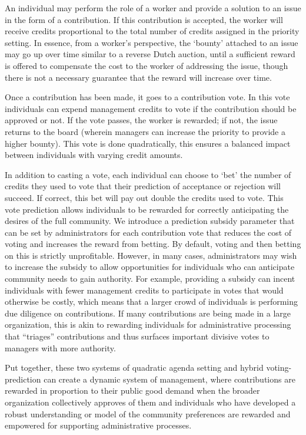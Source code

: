 \documentclass{article}
\begin{document}
An individual may perform the role of a worker and provide a solution to an issue in the form of a contribution. If this contribution is accepted, the worker will receive credits proportional to the total number of credits assigned in the priority setting. In essence, from a worker's perspective, the `bounty' attached to an issue may go up over time similar to a reverse Dutch auction, until a sufficient reward is offered to compensate the cost to the worker of addressing the issue, though there is not a necessary guarantee that the reward will increase over time.

Once a contribution has been made, it goes to a contribution vote. In this vote individuals can expend management credits to vote if the contribution should be approved or not. If the vote passes, the worker is rewarded; if not, the issue returns to the board (wherein managers can increase the priority to provide a higher bounty). This vote is done quadratically, this ensures a balanced impact between individuals with varying credit amounts.

In addition to casting a vote, each individual can choose to `bet' the number of credits they used to vote that their prediction of acceptance or rejection will succeed. If correct, this bet will pay out double the credits used to vote. This vote prediction allows individuals to be rewarded for correctly anticipating the desires of the full community. We introduce a prediction subsidy parameter that can be set by administrators for each contribution vote that reduces the cost of voting and increases the reward from betting. By default, voting and then betting on this is strictly unprofitable. However, in many cases, administrators may wish to increase the subsidy to allow opportunities for individuals who can anticipate community needs to gain authority. For example, providing a subsidy can incent individuals with fewer management credits to participate in votes that would otherwise be costly, which means that a larger crowd of individuals is performing due diligence on contributions. If many contributions are being made in a large organization, this is akin to rewarding individuals for administrative processing that ``triages'' contributions and thus surfaces important divisive votes to managers with more authority.

Put together, these two systems of quadratic agenda setting and hybrid voting-prediction can create a dynamic system of management, where contributions are rewarded in proportion to their public good demand when the broader organization collectively approves of them and individuals who have developed a robust understanding or model of the community preferences are rewarded and empowered for supporting administrative processes.
\end{document}
